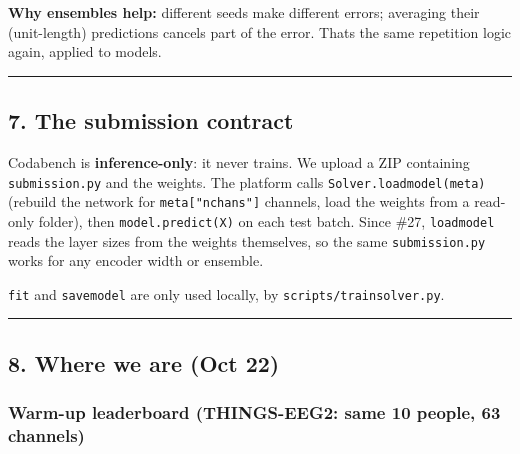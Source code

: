 \documentclass[
  11pt,
]{article}
\renewcommand{\_}{\oldunderscore\allowbreak}
\begin{document}
\textbf{Why ensembles help:} different
seeds make different errors; averaging
their (unit-length) predictions cancels
part of the error.
That\textquotesingle s the same
repetition logic again, applied to
models.

\begin{center}\rule{0.5\linewidth}{0.5pt}\end{center}

\subsection{7. The submission
contract}\label{the-submission-contract}

Codabench is \textbf{inference-only}: it
never trains. We upload a ZIP containing
\texttt{submission.py} and the weights.
The platform calls
\texttt{Solver.load\_model(meta)}
(rebuild the network for
\texttt{meta{[}"n\_chans"{]}} channels,
load the weights from a read-only
folder), then \texttt{model.predict(X)}
on each test batch. Since \#27,
\texttt{load\_model} reads the layer
sizes from the weights themselves, so
the same \texttt{submission.py} works
for any encoder width or ensemble.

\texttt{fit} and \texttt{save\_model}
are only used locally, by
\texttt{scripts/train\_solver.py}.

\begin{center}\rule{0.5\linewidth}{0.5pt}\end{center}

\subsection{8. Where we are (Oct
22)}\label{where-we-are-oct-22}

\subsubsection{Warm-up leaderboard
(THINGS-EEG2: same 10 people, 63
channels)}\label{warm-up-leaderboard-things-eeg2-same-10-people-63-channels}
\end{document}
